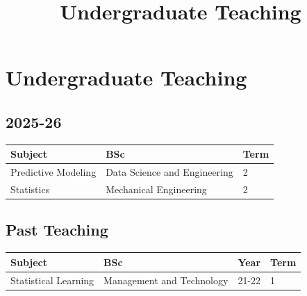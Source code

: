 \title{Undergraduate Teaching}

\section*{Undergraduate Teaching}

\subsection*{2025-26}

\begin{tabular}{lll}
  \hline
  Subject & BSc & Term \\
  \hline
  Predictive Modeling & Data Science and Engineering & 2 \\
  Statistics & Mechanical Engineering & 2 \\
  \hline
\end{tabular}

\subsection*{Past Teaching}

\begin{tabular}{llll}
  \hline
  Subject & BSc & Year & Term \\
  \hline
  Statistical Learning & Management and Technology & 21-22 & 1 \\
  \hline
\end{tabular}
